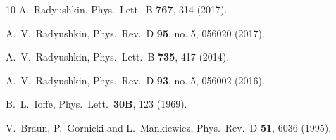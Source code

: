 \documentclass[aps,prd,twocolumn,showpacs,preprintnumbers,superscriptaddress,groupedaddress]{revtex4-1}
\begin{document}
\begin{thebibliography}{10}
  A.~Radyushkin,
  Phys.\ Lett.\ B {\bf 767}, 314 (2017).



  A.~V.~Radyushkin,
  Phys.\ Rev.\ D {\bf 95}, no. 5, 056020 (2017).



  A.~V.~Radyushkin,
  Phys.\ Lett.\ B {\bf 735}, 417 (2014).



  A.~V.~Radyushkin,
  Phys.\ Rev.\ D {\bf 93}, no. 5, 056002 (2016).



  B.~L.~Ioffe,
  Phys.\ Lett.\  {\bf 30B}, 123 (1969).



  V.~Braun, P.~Gornicki and L.~Mankiewicz,
  Phys.\ Rev.\ D {\bf 51}, 6036 (1995).




\end{thebibliography}
\end{document}
